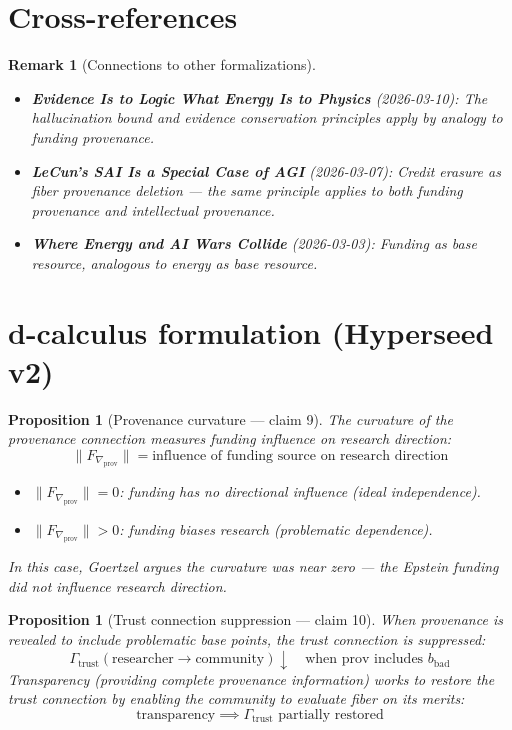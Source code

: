 \documentclass[11pt,a4paper]{article}
\newtheorem{proposition}[definition]{Proposition}
\newtheorem{remark}[definition]{Remark}
\begin{document}
\section{Cross-references}

\begin{remark}[Connections to other formalizations]
\begin{itemize}
\item \textbf{Evidence Is to Logic What Energy Is to Physics} (2026-03-10):
  The hallucination bound and evidence conservation principles apply
  by analogy to funding provenance.
\item \textbf{LeCun's SAI Is a Special Case of AGI} (2026-03-07):
  Credit erasure as fiber provenance deletion --- the same principle
  applies to both funding provenance and intellectual provenance.
\item \textbf{Where Energy and AI Wars Collide} (2026-03-03):
  Funding as base resource, analogous to energy as base resource.
\end{itemize}
\end{remark}

\section{d-calculus formulation (Hyperseed v2)}

\begin{proposition}[Provenance curvature --- claim 9]
\label{prop:curvature}
The curvature of the provenance connection measures funding influence
on research direction:
\[
  \|F_{\nabla_{\text{prov}}}\| = \text{influence of funding source
    on research direction}
\]
\begin{itemize}
  \item $\|F_{\nabla_{\text{prov}}}\| = 0$: funding has no directional
    influence (ideal independence).
  \item $\|F_{\nabla_{\text{prov}}}\| > 0$: funding biases research
    (problematic dependence).
\end{itemize}
In this case, Goertzel argues the curvature was near zero --- the
Epstein funding did not influence research direction.
\end{proposition}

\begin{proposition}[Trust connection suppression --- claim 10]
\label{prop:trust}
When provenance is revealed to include problematic base points, the
trust connection is suppressed:
\[
  \Gamma_{\text{trust}}(\text{researcher} \to \text{community})
  \downarrow \quad \text{when prov includes } b_{\text{bad}}
\]
Transparency (providing complete provenance information) works to
restore the trust connection by enabling the community to evaluate
fiber on its merits:
\[
  \text{transparency} \implies \Gamma_{\text{trust}} \text{ partially
    restored}
\]
\end{proposition}
\end{document}
